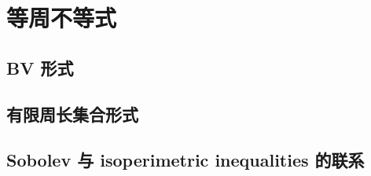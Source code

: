 \section{等周不等式}
\label{b1:sec:2706}


\subsection{BV 形式}
\label{b1:subsec:270601}

\subsection{有限周长集合形式}
\label{b1:subsec:270602}

\subsection{Sobolev 与 isoperimetric inequalities 的联系}
\label{b1:subsec:270603}


